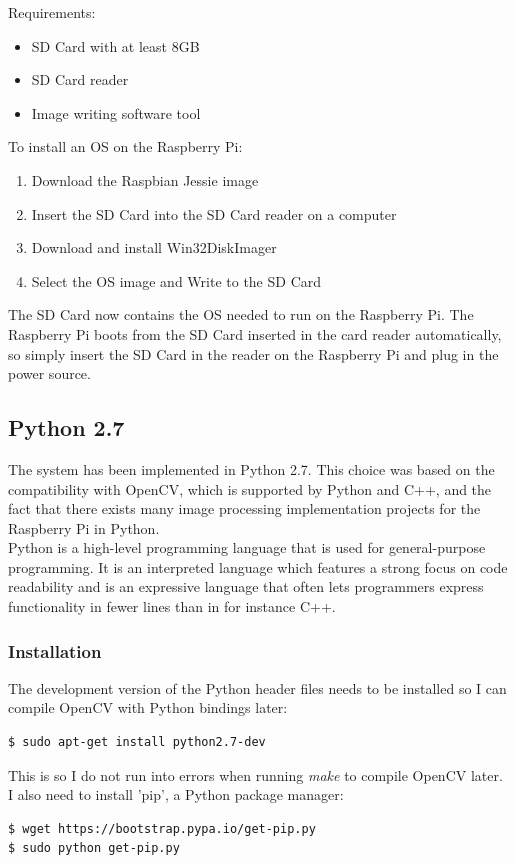 Requirements:
\begin{itemize}
\item SD Card with at least 8GB
\item SD Card reader
\item Image writing software tool
\end{itemize}

To install an OS on the Raspberry Pi:
\begin{enumerate}
\item Download the Raspbian Jessie image\cite{jessie}
\item Insert the SD Card into the SD Card reader on a computer
\item Download and install Win32DiskImager\cite{win}
\item Select the OS image and Write to the SD Card
\end{enumerate}

The SD Card now contains the OS needed to run on the Raspberry Pi. The Raspberry Pi boots from the SD Card inserted in the card reader automatically, so simply insert the SD Card in the reader on the Raspberry Pi and plug in the power source. 

\subsection{Python 2.7}
The system has been implemented in Python 2.7. This choice was based on the compatibility with OpenCV, which is supported by Python and C++, and the fact that there exists many image processing implementation projects for the Raspberry Pi in Python.\\

Python is a high-level programming language that is used for general-purpose programming. It is an interpreted language which features a strong focus on code readability and is an expressive language that often lets programmers express functionality in fewer lines than in for instance C++. \cite{gui}

\subsubsection{Installation}
The development version of the Python header files needs to be installed so I can compile OpenCV with Python bindings later:
\begin{verbatim}
$ sudo apt-get install python2.7-dev
\end{verbatim}
This is so I do not run into errors when running \emph{make} to compile OpenCV later. I also need to install 'pip', a Python package manager:
\begin{verbatim}
$ wget https://bootstrap.pypa.io/get-pip.py
$ sudo python get-pip.py
\end{verbatim}

